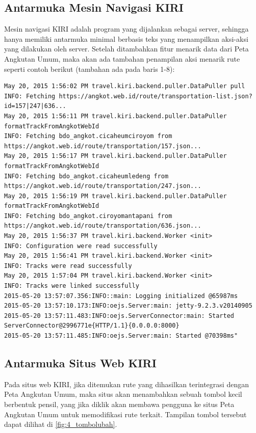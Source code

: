 \subsection{Antarmuka Mesin Navigasi KIRI}

Mesin navigasi KIRI adalah program yang dijalankan sebagai server, sehingga hanya memiliki antarmuka minimal berbasis teks yang menampilkan aksi-aksi yang dilakukan oleh server. Setelah ditambahkan fitur menarik data dari Peta Angkutan Umum, maka akan ada tambahan penampilan aksi menarik rute seperti contoh berikut (tambahan ada pada baris 1-8):

\begin{lstlisting}
May 20, 2015 1:56:02 PM travel.kiri.backend.puller.DataPuller pull
INFO: Fetching https://angkot.web.id/route/transportation-list.json?id=157|247|636...
May 20, 2015 1:56:11 PM travel.kiri.backend.puller.DataPuller formatTrackFromAngkotWebId
INFO: Fetching bdo_angkot.cicaheumciroyom from https://angkot.web.id/route/transportation/157.json...
May 20, 2015 1:56:17 PM travel.kiri.backend.puller.DataPuller formatTrackFromAngkotWebId
INFO: Fetching bdo_angkot.cicaheumledeng from https://angkot.web.id/route/transportation/247.json...
May 20, 2015 1:56:19 PM travel.kiri.backend.puller.DataPuller formatTrackFromAngkotWebId
INFO: Fetching bdo_angkot.ciroyomantapani from https://angkot.web.id/route/transportation/636.json...
May 20, 2015 1:56:37 PM travel.kiri.backend.Worker <init>
INFO: Configuration were read successfully
May 20, 2015 1:56:41 PM travel.kiri.backend.Worker <init>
INFO: Tracks were read successfully
May 20, 2015 1:57:04 PM travel.kiri.backend.Worker <init>
INFO: Tracks were linked successfully
2015-05-20 13:57:07.356:INFO::main: Logging initialized @65987ms
2015-05-20 13:57:10.173:INFO:oejs.Server:main: jetty-9.2.3.v20140905
2015-05-20 13:57:11.483:INFO:oejs.ServerConnector:main: Started ServerConnector@2996771e{HTTP/1.1}{0.0.0.0:8000}
2015-05-20 13:57:11.485:INFO:oejs.Server:main: Started @70398ms"
\end{lstlisting}


\subsection{Antarmuka Situs Web KIRI}

Pada situs web KIRI, jika ditemukan rute yang dihasilkan terintegrasi dengan Peta Angkutan Umum, maka situs akan menambahkan sebuah tombol kecil berbentuk pensil, yang jika diklik akan membawa pengguna ke situs Peta Angkutan Umum untuk memodifikasi rute terkait. Tampilan tombol tersebut dapat dilihat di \ref{fig:4_tombolubah}.

